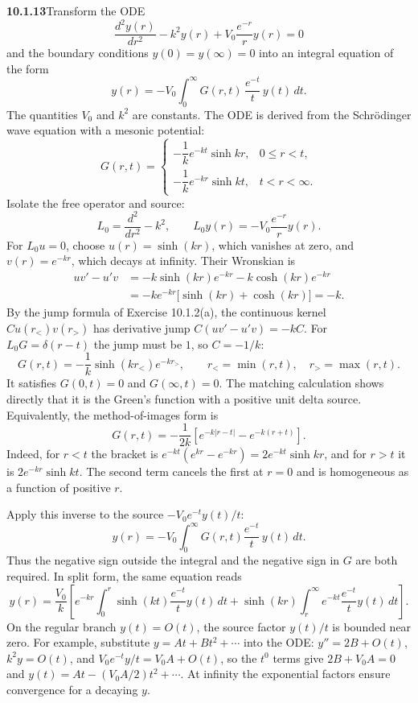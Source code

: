 \par\bigskip
\noindent\textbf{10.1.13}\quad Transform the ODE
\[
\frac{d^{2}y(r)}{dr^{2}}-k^{2}y(r)+V_{0}\frac{e^{-r}}{r}y(r)=0
\]
and the boundary conditions $y(0)=y(\infty)=0$ into an integral equation of
the form
\[
y(r)=-V_{0}\int_{0}^{\infty}G(r,t)\,\frac{e^{-t}}{t}\,y(t)\,dt.
\]
The quantities $V_{0}$ and $k^{2}$ are constants.
The ODE is derived from the
Schr\"odinger wave equation with a mesonic potential:
\[
G(r,t)=\begin{cases}
-\dfrac{1}{k}e^{-kt}\sinh kr, & 0\le r<t,\\[6pt]
-\dfrac{1}{k}e^{-kr}\sinh kt, & t<r<\infty.
\end{cases}
\]
\solution
{}
Isolate the free operator and source:
\[
L_0=\frac{d^2}{dr^2}-k^2,\qquad
L_0y(r)=-V_0\frac{e^{-r}}r y(r).
\]
For $L_0u=0$, choose $u(r)=\sinh(kr)$, which vanishes at zero,
and $v(r)=e^{-kr}$, which decays at infinity. Their Wronskian is
\begin{align*}
uv'-u'v
&=-k\sinh(kr)e^{-kr}-k\cosh(kr)e^{-kr}\\
&=-ke^{-kr}\bigl[\sinh(kr)+\cosh(kr)\bigr]=-k.
\end{align*}
By the jump formula of Exercise 10.1.2(a), the continuous kernel
$C u(r_<)v(r_>)$ has derivative jump $C(uv'-u'v)=-kC$.
For $L_0G=\delta(r-t)$ the jump must be $1$, so $C=-1/k$:
\[
\boxed{G(r,t)=-\frac1k\sinh(kr_<)e^{-kr_>},
\qquad r_<=\min(r,t),\quad r_>=\max(r,t).}
\]
It satisfies $G(0,t)=0$ and $G(\infty,t)=0$. The matching calculation
shows directly that it is the Green's function with a positive unit
delta source. Equivalently, the method-of-images form is
\[
G(r,t)=-\frac1{2k}\left[e^{-k|r-t|}-e^{-k(r+t)}\right].
\]
Indeed, for $r<t$ the bracket is
$e^{-kt}(e^{kr}-e^{-kr})=2e^{-kt}\sinh kr$, and for $r>t$ it is
$2e^{-kr}\sinh kt$. The second term cancels the first at $r=0$ and is
homogeneous as a function of positive $r$.

Apply this inverse to the source $-V_0e^{-t}y(t)/t$:
\[
\boxed{y(r)=-V_0\int_0^\infty G(r,t)\frac{e^{-t}}t\,y(t)\,dt.}
\]
Thus the negative sign outside the integral and the negative sign in
$G$ are both required. In split form, the same equation reads
\[
y(r)=\frac{V_0}{k}\left[
e^{-kr}\int_0^r\sinh(kt)\frac{e^{-t}}t y(t)\,dt
+\sinh(kr)\int_r^\infty e^{-kt}\frac{e^{-t}}t y(t)\,dt\right].
\]
On the regular branch $y(t)=O(t)$, the source factor $y(t)/t$ is bounded
near zero. For example, substitute $y=At+Bt^2+\cdots$ into the ODE:
$y''=2B+O(t)$, $k^2y=O(t)$, and $V_0e^{-t}y/t=V_0A+O(t)$, so the
$t^0$ terms give $2B+V_0A=0$ and
$y(t)=At-(V_0A/2)t^2+\cdots$. At infinity the exponential factors
ensure convergence for a decaying $y$.

